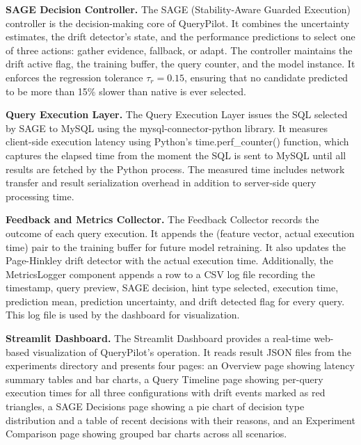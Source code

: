 \textbf{SAGE Decision Controller.} The SAGE (Stability-Aware Guarded
Execution) controller is the decision-making core of QueryPilot. It combines
the uncertainty estimates, the drift detector's state, and the performance
predictions to select one of three actions: gather evidence, fallback, or
adapt. The controller maintains the drift active flag, the training buffer,
the query counter, and the model instance. It enforces the regression
tolerance $\tau_r = 0.15$, ensuring that no candidate predicted to be more
than 15\% slower than native is ever selected.

\textbf{Query Execution Layer.} The Query Execution Layer issues the SQL
selected by SAGE to MySQL using the mysql-connector-python library. It
measures client-side execution latency using Python's time.perf\_counter()
function, which captures the elapsed time from the moment the SQL is sent to
MySQL until all results are fetched by the Python process. The measured time
includes network transfer and result serialization overhead in addition to
server-side query processing time.

\textbf{Feedback and Metrics Collector.} The Feedback Collector records the
outcome of each query execution. It appends the (feature vector, actual
execution time) pair to the training buffer for future model retraining. It
also updates the Page-Hinkley drift detector with the actual execution time.
Additionally, the MetricsLogger component appends a row to a CSV log file
recording the timestamp, query preview, SAGE decision, hint type selected,
execution time, prediction mean, prediction uncertainty, and drift detected
flag for every query. This log file is used by the dashboard for visualization.

\textbf{Streamlit Dashboard.} The Streamlit Dashboard provides a real-time
web-based visualization of QueryPilot's operation. It reads result JSON files
from the experiments directory and presents four pages: an Overview page
showing latency summary tables and bar charts, a Query Timeline page showing
per-query execution times for all three configurations with drift events
marked as red triangles, a SAGE Decisions page showing a pie chart of decision
type distribution and a table of recent decisions with their reasons, and an
Experiment Comparison page showing grouped bar charts across all scenarios.
